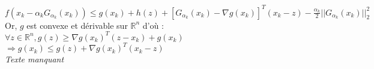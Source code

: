 \documentclass[12pt,a4paper]{article}
\begin{document}
$f(x_k - \alpha_k G_{\alpha_k}(x_k)) \leq g(x_k) + h(z) + [G_{\alpha_k}(x_k) - \nabla g(x_k)]^T (x_k - z) - \frac{\alpha_k}{2} ||G_{\alpha_k}(x_k)||_2^2$\\

Or, $g$ est convexe et dérivable sur $\mathbb{R}^n$ d'où :
$\forall z \in \mathbb{R}^n, g(z) \geq \nabla g(x_k)^T (z - x_k) + g(x_k)$\\
$\Rightarrow g(x_k) \leq g(z) + \nabla g(x_k)^T (x_k - z)$\\


\textit{Texte manquant}\\
\end{document}
